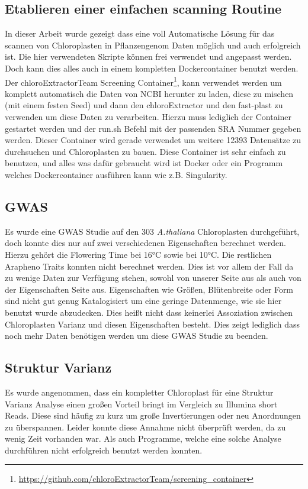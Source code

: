 \documentclass{scrartcl}
\begin{document}
\subsection{Etablieren einer einfachen scanning Routine}
\label{sec-5-5}
In dieser Arbeit wurde gezeigt dass eine voll Automatische Lösung für das scannen von Chloroplasten in Pflanzengenom Daten möglich und auch erfolgreich ist. Die hier verwendeten Skripte können frei verwendet und angepasst werden. 
Doch kann dies alles auch in einem kompletten Dockercontainer benutzt werden. Der chloroExtractorTeam Screening Container\footnote{\url{https://github.com/chloroExtractorTeam/screening_container}}, kann verwendet werden um komplett automatisch die Daten von NCBI herunter zu laden, diese zu mischen
(mit einem festen Seed) und dann den chloroExtractor und den fast-plast zu verwenden um diese Daten zu verarbeiten. Hierzu muss lediglich der Container gestartet werden und der run.sh Befehl mit der passenden SRA Nummer gegeben 
werden. Dieser Container wird gerade verwendet um weitere 12393 Datensätze zu durchsuchen und Chloroplasten zu bauen. Diese Container ist sehr einfach zu benutzen, und alles was dafür gebraucht wird ist Docker\footnotemark[47]{} oder ein Programm
welches Dockercontainer ausführen kann wie z.B. Singularity\footnotemark[56]{}. 
\subsection{GWAS}
\label{sec-5-6}
Es wurde eine GWAS Studie auf den 303 \emph{A.thaliana} Chloroplasten durchgeführt, doch konnte dies nur auf zwei verschiedenen Eigenschaften berechnet werden. Hierzu gehört die Flowering Time bei 16°C sowie bei 10°C. 
Die restlichen Arapheno Traits konnten nicht berechnet werden. Dies ist vor allem der Fall da zu wenige Daten zur Verfügung stehen, sowohl von unserer Seite aus als auch von der Eigenschaften Seite aus. Eigenschaften wie
Größen, Blütenbreite oder Form sind nicht gut genug Katalogisiert um eine geringe Datenmenge, wie sie hier benutzt wurde abzudecken. Dies heißt nicht dass keinerlei Assoziation zwischen Chloroplasten Varianz und diesen Eigenschaften besteht.
Dies zeigt lediglich dass noch mehr Daten benötigen werden um diese GWAS Studie zu beenden‌.
\subsection{Struktur Varianz}
\label{sec-5-7}
Es wurde angenommen, dass ein kompletter Chloroplast für eine Struktur Varianz Analyse einen großen Vorteil bringt im Vergleich zu Illumina short Reads. Diese sind häufig zu kurz um große Invertierungen oder neu Anordnungen zu 
überspannen. Leider konnte diese Annahme nicht überprüft werden, da zu wenig Zeit vorhanden war. Als auch Programme, welche eine solche Analyse durchführen nicht erfolgreich benutzt werden konnten. 
\end{document}
